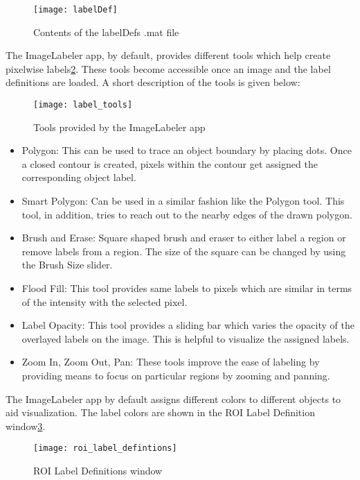 \documentclass[paper=a4,11pt,parskip=half,toc=listof]{scrartcl}
\begin{document}
	\begin{figure}[htb!]
		\centering
		\texttt{[image: labelDef]}
		\caption{Contents of the labelDefs .mat file}
		\label{Fig:2}
	\end{figure}
	
The ImageLabeler app, by default, provides different tools which help create pixelwise labels\ref{Fig:3}. These tools become accessible once an image and the label definitions are loaded. A short description of the tools is given below:
	\begin{figure}[htb!]
		\centering
		\texttt{[image: label\_tools]}
		\caption{Tools provided by the ImageLabeler app}
		\label{Fig:3}
	\end{figure}
	
	\begin{itemize}
		\item Polygon: This can be used to trace an object boundary by placing dots. Once a closed contour is created, pixels within the contour get assigned the corresponding object label.
		\item Smart Polygon: Can be used in a similar fashion like the Polygon tool. This tool, in addition, tries to reach out to the nearby edges of the drawn polygon.
		\item Brush and Erase: Square shaped brush and eraser to either label a region or remove labels from a region. The size of the square can be changed by using the Brush Size slider.
		\item Flood Fill: This tool provides same labels to pixels which are similar in terms of the intensity with the selected pixel.
		\item Label Opacity: This tool provides a sliding bar which varies the opacity of the overlayed labels on the image. This is helpful to visualize the assigned labels.
		\item Zoom In, Zoom Out, Pan: These tools improve the ease of labeling by providing means to focus on particular regions by zooming and panning.
	\end{itemize}
	
The ImageLabeler app by default assigns different colors to different objects to aid visualization. The label colors are shown in the ROI Label Definition window\ref{Fig:4}.
	\begin{figure}[htb!]
		\centering
		\texttt{[image: roi\_label\_defintions]}
		\caption{ROI Label Definitions window}
		\label{Fig:4}
	\end{figure}
	
\end{document}
